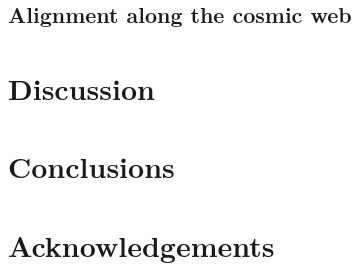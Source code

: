 \documentclass{emulateapj}
\begin{document}
\subsection{Alignment along the cosmic web}


\section{Discussion}
\label{sec:discussion}

\section{Conclusions}
\label{sec:conclusions}


\section*{Acknowledgements}


 
\end{document}

